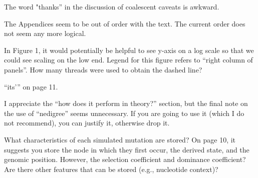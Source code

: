 
\begin{point}{}
The word "thanks” in the discussion of coalescent caveats is awkward.
\end{point}


\begin{point}{}
The Appendices seem to be out of order with the text. The current order does
not seem any more logical.
\end{point}


\begin{point}{}
In Figure 1, it would potentially be helpful to see y-axis on a log scale so
that we could see scaling on the low end. Legend for this figure refers to
``right column of panels''. How many threads were used to obtain the dashed line?
\end{point}


\begin{point}{}
``its{'}'' on page 11.
\end{point}


\begin{point}{}
I appreciate the ``how does it perform in theory?'' section, but the final note
on the use of ``nedigree'' seems unnecessary. If you are going to use it (which I
do not recommend), you can justify it, otherwise drop it.
\end{point}


\begin{point}{}
What characteristics of each simulated mutation are stored? On page 10, it
suggests you store the node in which they first occur, the derived state, and
the genomic position. However, the selection coefficient and dominance
coefficient? Are there other features that can be stored (e.g., nucleotide
context)?
\end{point}

